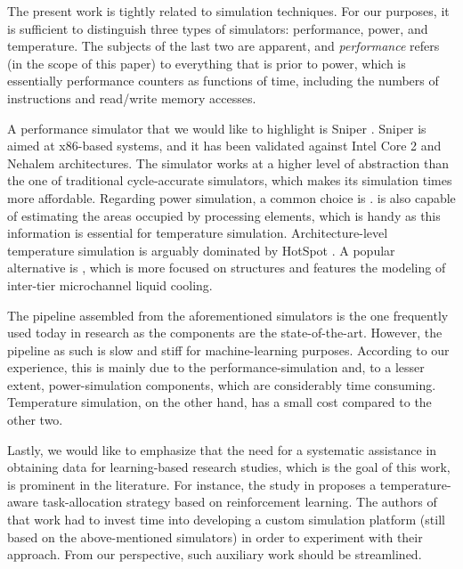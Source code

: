 The present work is tightly related to simulation techniques. For our purposes,
it is sufficient to distinguish three types of simulators: performance, power,
and temperature. The subjects of the last two are apparent, and
\emph{performance} refers (in the scope of this paper) to everything that is
prior to power, which is essentially performance counters as functions of time,
including the numbers of instructions and read/write memory accesses.

A performance simulator that we would like to highlight is Sniper
\cite{carlson2011}. Sniper is aimed at x86-based systems, and it has been
validated against Intel Core 2 and Nehalem architectures. The simulator works at
a higher level of abstraction than the one of traditional cycle-accurate
simulators, which makes its simulation times more affordable. Regarding power
simulation, a common choice is  \cite{li2009}.  is also
capable of estimating the areas occupied by processing elements, which is handy
as this information is essential for temperature simulation. Architecture-level
temperature simulation is arguably dominated by HotSpot \cite{skadron2004}. A
popular alternative is  \cite{sridhar2010}, which is more focused on
 structures and features the modeling of inter-tier microchannel liquid
cooling.

The pipeline assembled from the aforementioned simulators is the one frequently
used today in research as the components are the state-of-the-art. However, the
pipeline as such is slow and stiff for machine-learning purposes. According to
our experience, this is mainly due to the performance-simulation and, to a
lesser extent, power-simulation components, which are considerably time
consuming. Temperature simulation, on the other hand, has a small cost compared
to the other two.

Lastly, we would like to emphasize that the need for a systematic assistance in
obtaining data for learning-based research studies, which is the goal of this
work, is prominent in the literature. For instance, the study in \cite{lu2015}
proposes a temperature-aware task-allocation strategy based on reinforcement
learning. The authors of that work had to invest time into developing a custom
simulation platform (still based on the above-mentioned simulators) in order to
experiment with their approach. From our perspective, such auxiliary work should
be streamlined.
